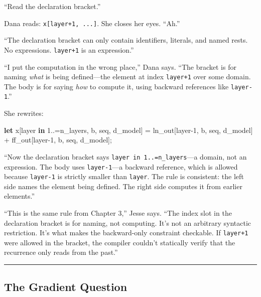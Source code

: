 \documentclass[11pt,]{article}
\newenvironment{Shaded}{}{}
\newcommand{\DecValTok}[1]{\textcolor[rgb]{0.25,0.63,0.44}{#1}}
\newcommand{\KeywordTok}[1]{\textcolor[rgb]{0.00,0.44,0.13}{\textbf{#1}}}
\newcommand{\NormalTok}[1]{#1}
\newcommand{\OperatorTok}[1]{\textcolor[rgb]{0.40,0.40,0.40}{#1}}
\begin{document}
``Read the declaration bracket.''

Dana reads: \texttt{x{[}layer+1,\ ...{]}}. She closes her eyes. ``Ah.''

``The declaration bracket can only contain identifiers, literals, and
named rests. No expressions. \texttt{layer+1} is an expression.''

``I put the computation in the wrong place,'' Dana says. ``The bracket
is for naming \emph{what} is being defined---the element at index
\texttt{layer+1} over some domain. The body is for saying \emph{how} to
compute it, using backward references like \texttt{layer-1}.''

She rewrites:

\begin{Shaded}
\begin{Highlighting}[]
\KeywordTok{let}\NormalTok{ x}\OperatorTok{[}\NormalTok{layer }\KeywordTok{in} \DecValTok{1.}\NormalTok{.=n_layers, b, seq, d_model}\OperatorTok{]}\NormalTok{ =}
\NormalTok{    ln_out}\OperatorTok{[}\NormalTok{layer-}\DecValTok{1}\NormalTok{, b, seq, d_model}\OperatorTok{]}\NormalTok{ + ff_out}\OperatorTok{[}\NormalTok{layer-}\DecValTok{1}\NormalTok{, b, seq, d_model}\OperatorTok{]}\NormalTok{;}
\end{Highlighting}
\end{Shaded}

``Now the declaration bracket says \texttt{layer\ in\ 1..=n\_layers}---a
domain, not an expression. The body uses \texttt{layer-1}---a backward
reference, which is allowed because \texttt{layer-1} is strictly smaller
than \texttt{layer}. The rule is consistent: the left side names the
element being defined. The right side computes it from earlier
elements.''

``This is the same rule from Chapter 3,'' Jesse says. ``The index slot
in the declaration bracket is for naming, not computing. It's not an
arbitrary syntactic restriction. It's what makes the backward-only
constraint checkable. If \texttt{layer+1} were allowed in the bracket,
the compiler couldn't statically verify that the recurrence only reads
from the past.''

\begin{center}\rule{0.5\linewidth}{0.4pt}\end{center}

\hypertarget{the-gradient-question}{%
\subsection{The Gradient Question}\label{the-gradient-question}}
\end{document}
